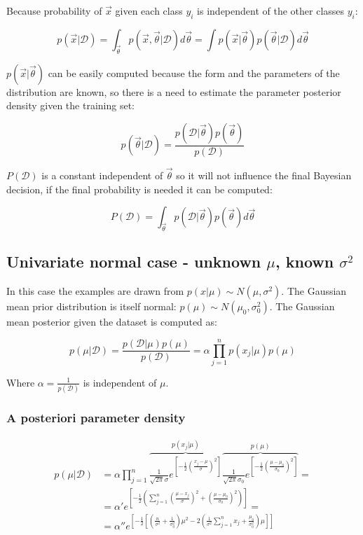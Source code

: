	Because probability of $\vec{x}$ given each class $y_i$ is independent of the other classes $y_i$:

	$$p(\vec{x}|\mathcal{D}) = \int_{\vec{\theta}} p(\vec{x}, \vec{\theta}|\mathcal{D})d\vec{\theta} =\int p(\vec{x}|\vec{\theta})p(\vec{\theta}|\mathcal{D})d\vec{\theta}$$

	$p(\vec{x}|\vec{\theta})$ can be easily computed because the form and the parameters of the distribution are known, so there is a need to estimate the parameter posterior density given the training set:

	$$p(\vec{\theta}|\mathcal{D}) = \frac{p(\mathcal{D}|\vec{\theta})p(\vec{\theta})}{p(\mathcal{D})}$$

	$P(\mathcal{D})$ is a constant independent of $\vec{\theta}$ so it will not influence the final Bayesian decision, if the final probability is needed it can be computed:

	$$P(\mathcal{D}) = \int_{\vec{\theta}}p(\mathcal{D}|\vec{\theta})p(\vec{\theta})d\vec{\theta}$$

	\subsection{Univariate normal case - unknown $\mu$, known $\sigma^2$}
	In this case the examples are drawn from $p(x|\mu)\sim N(\mu, \sigma^2)$.
	The Gaussian mean prior distribution is itself normal: $p(\mu) \sim N(\mu_0, \sigma^2_0)$.
	The Gaussian mean posterior given the dataset is computed as:

	$$p(\mu|\mathcal{D}) = \frac{p(\mathcal{D}|\mu)p(\mu)}{p(\mathcal{D})} = \alpha\prod\limits_{j=1}^np(x_j|\mu)p(\mu)$$

	Where $\alpha = \frac{1}{p(\mathcal{D})}$ is independent of $\mu$.

		\subsubsection{A posteriori parameter density}

		\begin{align*}
			p(\mu|\mathcal{D}) &= \alpha\prod\limits_{j = 1}^n\overbrace{\frac{1}{\sqrt{2\pi}\sigma}e^{[-\frac{1}{2}(\frac{x_j-\mu}{\sigma})^2]}}^{p(x_j|\mu)}\overbrace{\frac{1}{\sqrt{2\pi}\sigma_0}e^{[-\frac{1}{2}(\frac{\mu-\mu_0}{\sigma_0})^2]}}^{p(\mu)} =\\
												&=\alpha'e^{[-\frac{1}{2}(\sum\limits_{j=1}^n(\frac{\mu-x_j}{\sigma})^2+(\frac{\mu-\mu_0}{\sigma_0})^2)]} =\\
												&=\alpha''e^{[-\frac{1}{2}[(\frac{n}{\sigma^2}+\frac{1}{\sigma^2_0})\mu^2 - 2(\frac{1}{\sigma^2}\sum\limits_{j=1}^nx_j + \frac{\mu_0}{\sigma^2_0})\mu]]}
		\end{align*}

